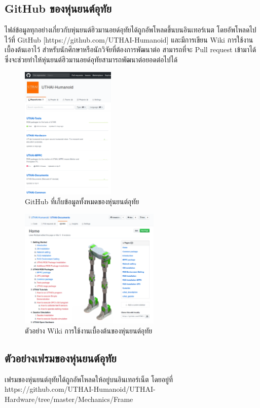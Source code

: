 \subsection{GitHub ของหุ่นยนต์อุทัย}
ไฟล์ข้อมูลทุกอย่างเกี่ยวกับหุ่นยนต์ฮิวมานอยด์อุทัยได้ถูกอัพโหลดขึ้นบนอินเทอร์เนต
โดยอัพโหลดไปไว้ที่ GitHub [https://github.com/UTHAI-Humanoid] และมีการเขียน Wiki การใช้งานเบื้องต้นเอาไว้
สำหรับนักศึกษาหรือนักวิจัยที่ต้องการพัฒนาต่อ สามารถที่จะ Pull request เข้ามาได้
ซึ่งจะช่วยทำให้หุ่นยนต์ฮิวมานอยด์อุทัยสามารถพัฒนาต่อยอดต่อไปได้
\begin{figure}[!ht]
	\centering
	\includegraphics[width=0.40\textwidth]{chapter4/images/uthai_manual/uthai_github.png}
	\caption{GitHub ที่เก็บข้อมูลทั้งหมดของหุ่นยนต์อุทัย}
\end{figure}
\begin{figure}[!ht]
	\centering
	\includegraphics[width=0.60\textwidth]{chapter4/images/uthai_manual/uthai_github2.png}
	\caption{ตัวอย่าง Wiki การใช้งานเบื้องต้นของหุ่นยนต์อุทัย}
\end{figure}


\clearpage
\subsection{ตัวอย่างเฟรมของหุ่นยนต์อุทัย}
เฟรมของหุ่นยนต์อุทัยได้ถูกอัพโหลดให้อยู่บนอินเทอร์เน็ต โดยอยู่ที่ https://github.com/UTHAI-Humanoid/UTHAI-Hardware/tree/master/Mechanics/Frame

